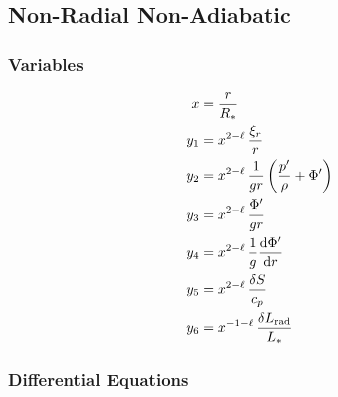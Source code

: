 \documentclass[fleqn]{article}
\newcommand{\diff}{\ensuremath{\mathrm{d}}}
\newcommand{\nabad}{\ensuremath{\nabla_{\rm ad}}}
\newcommand{\Rstar}{\ensuremath{R_{\ast}}}
\newcommand{\Lrad}{\ensuremath{L_{\rm rad}}}
\newcommand{\Lstar}{\ensuremath{L_{\ast}}}
\begin{document}




\newpage

\subsection*{Non-Radial Non-Adiabatic}

\subsubsection*{Variables}

\begin{align*}
x     &= \frac{r}{\Rstar} \\
y_{1} &= x^{2-\ell}\, \frac{\xi_{r}}{r} \\
y_{2} &= x^{2-\ell}\, \frac{1}{gr} \left( \frac{p'}{\rho} + \Phi' \right)\\
y_{3} &= x^{2-\ell}\, \frac{\Phi'}{gr}\\
y_{4} &= x^{2-\ell}\, \frac{1}{g} \frac{\diff \Phi'}{\diff r}\\
y_{5} &= x^{2-\ell}\, \frac{\delta S}{c_{p}}\\
y_{6} &= x^{-1-\ell}\, \frac{\delta \Lrad}{\Lstar}
\end{align*}

\subsubsection*{Differential Equations}
\end{document}
